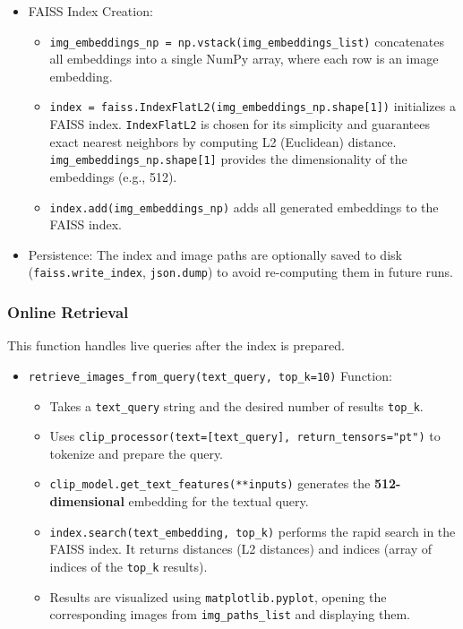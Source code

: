 \documentclass{article}
\begin{document}
\begin{itemize}
    \item FAISS Index Creation:
    \begin{itemize}
        \item \texttt{img\_embeddings\_np = np.vstack(img\_embeddings\_list)} concatenates all embeddings into a single NumPy array, where each row is an image embedding.
        \item \texttt{index = faiss.IndexFlatL2(img\_embeddings\_np.shape[1])} initializes a FAISS index. \texttt{IndexFlatL2} is chosen for its simplicity and guarantees exact nearest neighbors by computing L2 (Euclidean) distance. \texttt{img\_embeddings\_np.shape[1]} provides the dimensionality of the embeddings (e.g., 512).
        \item \texttt{index.add(img\_embeddings\_np)} adds all generated embeddings to the FAISS index.
    \end{itemize}
    \item Persistence: The index and image paths are optionally saved to disk (\texttt{faiss.write\_index}, \texttt{json.dump}) to avoid re-computing them in future runs.
\end{itemize}

\subsubsection{Online Retrieval}
This function handles live queries after the index is prepared.
\begin{itemize}
    \item \texttt{retrieve\_images\_from\_query(text\_query, top\_k=10)} Function:
    \begin{itemize}
        \item Takes a \texttt{text\_query} string and the desired number of results \texttt{top\_k}.
        \item Uses \texttt{clip\_processor(text=[text\_query], return\_tensors="pt")} to tokenize and prepare the query.
        \item \texttt{clip\_model.get\_text\_features(**inputs)} generates the \textbf{512-dimensional} embedding for the textual query.
        \item \texttt{index.search(text\_embedding, top\_k)} performs the rapid search in the FAISS index. It returns distances (L2 distances) and indices (array of indices of the \texttt{top\_k} results).
        \item Results are visualized using \texttt{matplotlib.pyplot}, opening the corresponding images from \texttt{img\_paths\_list} and displaying them.
    \end{itemize}
\end{itemize}
\end{document}
